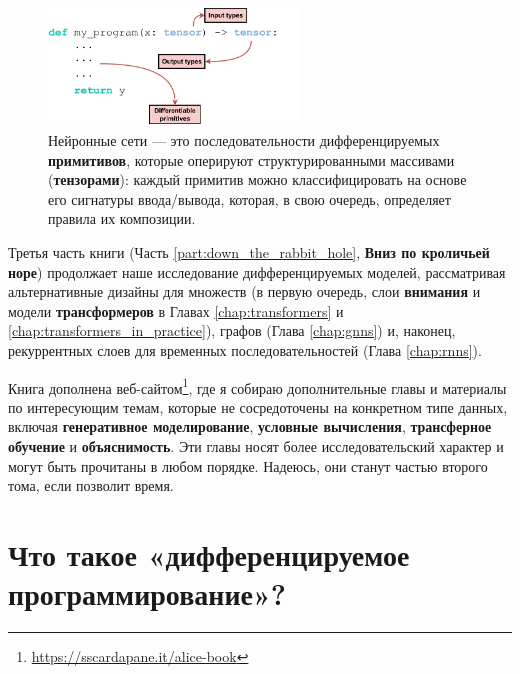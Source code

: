 \begin{figure}
    \centering
    \hspace{1em}\includegraphics[width=0.6\textwidth]{images/differentiable_programming.pdf}
    \caption{Нейронные сети — это последовательности дифференцируемых \textbf{примитивов}, которые оперируют структурированными массивами (\textbf{тензорами}): каждый примитив можно классифицировать на основе его сигнатуры ввода/вывода, которая, в свою очередь, определяет правила их композиции.}
    \label{fig:differentiable_programming}
\end{figure}

Третья часть книги (Часть \ref{part:down_the_rabbit_hole}, \textbf{Вниз по кроличьей норе}) продолжает наше исследование дифференцируемых моделей, рассматривая альтернативные дизайны для множеств (в первую очередь, слои \textbf{внимания} и модели \textbf{трансформеров} в Главах \ref{chap:transformers} и \ref{chap:transformers_in_practice}), графов (Глава \ref{chap:gnns}) и, наконец, рекуррентных слоев для временных последовательностей (Глава \ref{chap:rnns}).

Книга дополнена веб-сайтом\footnote{\url{https://sscardapane.it/alice-book}}, где я собираю дополнительные главы и материалы по интересующим темам, которые не сосредоточены на конкретном типе данных, включая \textbf{генеративное моделирование}, \textbf{условные вычисления}, \textbf{трансферное обучение} и \textbf{объяснимость}. Эти главы носят более исследовательский характер и могут быть прочитаны в любом порядке. Надеюсь, они станут частью второго тома, если позволит время.
%
\section*{Что такое «дифференцируемое программирование»?}

